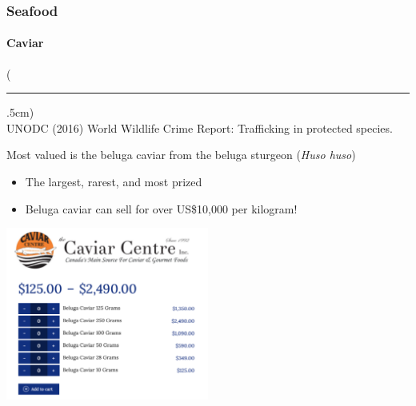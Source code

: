 \documentclass[10pt]{beamer}
\newenvironment{reference}[2]{%
	\begin{textblock*}{\textwidth}(#1,#2)
		\tiny\bgroup\color{gray}}{\egroup\end{textblock*}}
\begin{document}
\begin{frame}[t]
\frametitle{Seafood}
\framesubtitle{Caviar}
\vspace{0.5cm}

	\begin{reference}{4mm}{92mm}
		\rule{1.5cm}{0.25pt}\\
		UNODC (2016) World Wildlife Crime Report: Trafficking in protected species.
	\end{reference}
	
	Most valued is the beluga caviar from the beluga sturgeon (\emph{Huso huso})\\
	\medskip
		\begin{itemize}
			\item The largest, rarest, and most prized
			\medskip
			\item Beluga caviar can sell for over US\$10,000 per kilogram!
		\end{itemize}
	
	\vspace{0.25cm}
	
	\begin{center}
		\includegraphics[width=0.5\textwidth]{figures/caviar3.png}
	\end{center}	
\end{frame}
\end{document}

